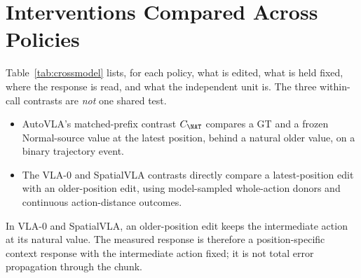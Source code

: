 \section{Interventions Compared Across Policies}
\label{sec:crossmodel}
Table~\ref{tab:crossmodel} lists, for each policy, what is edited, what is held fixed, where the response is read, and what the independent unit is. The three within-call contrasts are \emph{not} one shared test.
\begin{itemize}
\item AutoVLA's matched-prefix contrast $C_{\NAT}$ compares a GT and a frozen Normal-source value at the latest position, behind a natural older value, on a binary trajectory event.
\item The VLA-0 and SpatialVLA contrasts directly compare a latest-position edit with an older-position edit, using model-sampled whole-action donors and continuous action-distance outcomes.
\end{itemize}
In VLA-0 and SpatialVLA, an older-position edit keeps the intermediate action at its natural value. The measured response is therefore a position-specific context response with the intermediate action fixed; it is not total error propagation through the chunk.

